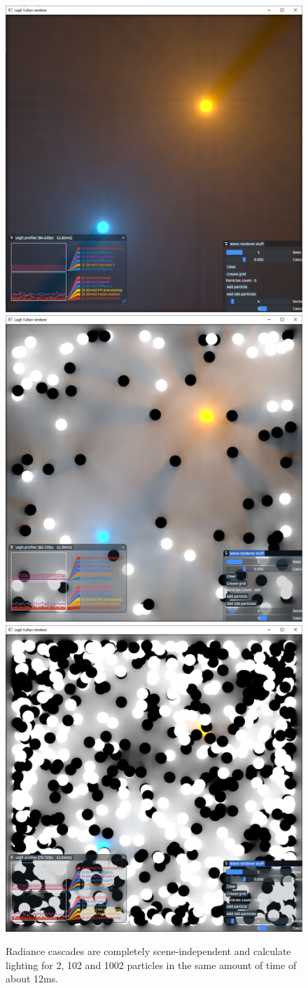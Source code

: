\documentclass{jcgt}
\begin{document}
\begin{figure}[htb]
  \centering
  \includegraphics[width=0.32\columnwidth]{images/flatland_2_particles_1024.png}
  \includegraphics[width=0.32\columnwidth]{images/flatland_102_particles_1024.png}
  \includegraphics[width=0.32\columnwidth]{images/flatland_1002_particles_1024.png}
  \caption{\label{fig:flatland_scaling}
     Radiance cascades are completely scene-independent and calculate lighting for 2, 102 and 1002 particles in the same amount of time of about 12ms.}
\end{figure}
\end{document}
